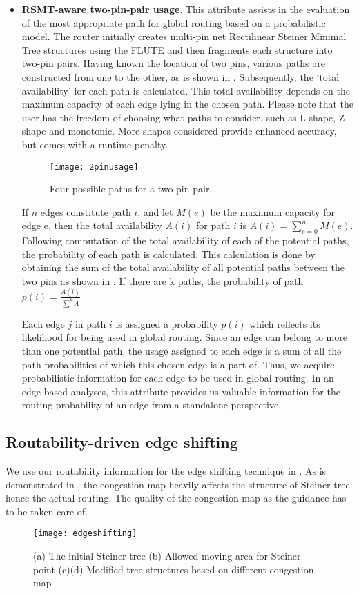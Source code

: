 \begin{itemize}
\item \textbf{RSMT-aware two-pin-pair usage}. This attribute assists in the evaluation of the most appropriate path for global routing based on a probabilistic model. The router initially creates multi-pin net Rectilinear Steiner Minimal Tree structures using the FLUTE \cite{FLUTE} and then fragments each structure into two-pin pairs. Having known the location of two pins, various paths are constructed from one to the other, as is shown in . Subsequently, the ‘total availability’ for each path is calculated. This total availability depends on the maximum capacity of each edge lying in the chosen path. Please note that the user has the freedom of choosing what paths to consider, such as L-shape, Z-shape and monotonic. More shapes considered provide enhanced accuracy, but comes with a runtime penalty.

\begin{figure}[tbh!]
    \centering
    \texttt{[image: 2pinusage]}
    \caption{Four possible paths for a two-pin pair.}
    \label{fig:2pinusage}
\end{figure}

If $n$ edges constitute path $i$, and let $M(e)$ be the maximum capacity for edge e, then the total availability $A(i)$ for path $i$ is $A(i)=\sum_{e=0}^{n}M(e)$. Following computation of the total availability of each of the potential paths, the probability of each path is calculated. This calculation is done by obtaining the sum of the total availability of all potential paths between the two pins as shown in .
If there are k paths, the probability of path $p(i)=\frac{A(i)}{\sum^{k}A}$

Each edge $j$ in path $i$ is assigned a probability $p(i)$ which reflects its likelihood for being used in global routing. Since an edge can belong to more than one potential path, the usage assigned to each edge is a sum of all the path probabilities of which this chosen edge is a part of. Thus, we acquire probabilistic information for each edge to be used in global routing. In an edge-based analyses, this attribute provides us valuable information for the routing probability of an edge from a standalone perspective.
\end{itemize}

\subsection{Routability-driven edge shifting}
We use our routability information for the edge shifting technique in \cite{fastroute}. As is demonstrated in , the congestion map heavily affects the structure of Steiner tree hence the actual routing. The quality of the congestion map as the guidance has to be taken care of.
\begin{figure}[htbp]
    \centerline{\texttt{[image: edgeshifting]}}
    \caption{(a) The initial Steiner tree (b) Allowed moving area for Steiner point (c)(d) Modified tree structures based on different congestion map}
    \label{fig:edgeshifting}
\end{figure}


